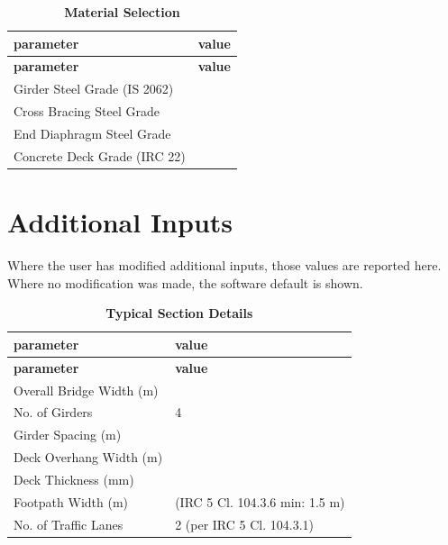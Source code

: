 \documentclass[12pt,a4paper]{report}
\numberwithin{table}{chapter}
\numberwithin{figure}{chapter}
\newcommand{\ReportTableGap}{\vspace{1em}}
\newcommand{\ReportSectionGap}{\vspace{1.5em}}
\begin{document}
\ReportTableGap

\begin{longtable}{|L{5.5cm}|L{8.5cm}|}

\caption{\textbf{Material Selection}}
\label{subsec:material}\\
\hline
\textbf{parameter} & \textbf{value} \\
\hline
\endfirsthead
\hline
\textbf{parameter} & \textbf{value} \\
\hline
\endhead

\textnormal{Girder Steel Grade (IS 2062)} &  \\
\hline
\textnormal{Cross Bracing Steel Grade} &  \\
\hline
\textnormal{End Diaphragm Steel Grade} &  \\
\hline
\textnormal{Concrete Deck Grade (IRC 22)} &  \\
\hline
\end{longtable}

\ReportTableGap

\newpage
\section{Additional Inputs}
\label{sec:additional-inputs}

Where the user has modified additional inputs, those values are reported here. Where no modification was made, the software default is shown.

\ReportSectionGap

\begin{longtable}{|L{5.5cm}|p{10.0cm}|}
\caption{\textbf{Typical Section Details}}\\
\hline
\textbf{parameter} & \textbf{value} \\
\hline
\endfirsthead
\hline
\textbf{parameter} & \textbf{value} \\
\hline
\endhead

\textnormal{Overall Bridge Width (m)} &  \\[6pt]
\hline
\textnormal{No. of Girders} & 4 \\[6pt]
\hline
\textnormal{Girder Spacing (m)} &  \\[6pt]
\hline
\textnormal{Deck Overhang Width (m)} &  \\[6pt]
\hline
\textnormal{Deck Thickness (mm)} &  \\[6pt]
\hline
\textnormal{Footpath Width (m)} &  (IRC 5 Cl. 104.3.6 min: 1.5 m) \\[6pt]
\hline
\textnormal{No. of Traffic Lanes} & 2 (per IRC 5 Cl. 104.3.1) \\[6pt]
\hline
\end{longtable}
\end{document}
